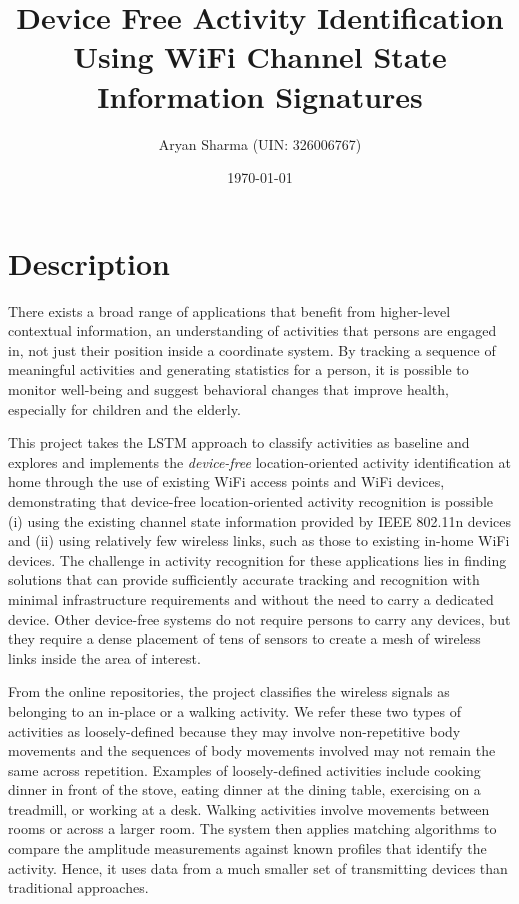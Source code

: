 \documentclass[letterpaper]{article}
\title{Device Free Activity Identification Using WiFi Channel State Information Signatures}
\author{Aryan Sharma (UIN: 326006767)}
\date{\today}
\newcommand\blankpage{%
	\null
	\thispagestyle{empty}%
	\addtocounter{page}{-1}%
	\newpage}
\begin{document}
\maketitle

\newpage

\tableofcontents

\newpage

\begin{versionhistory}
\end{versionhistory}

\newpage

\section{Description}
\label{sec:introduction}

There exists a broad range of applications that benefit from higher-level contextual information, an understanding of activities that persons are engaged in, not just their position inside a coordinate system. By tracking a sequence of meaningful activities and generating statistics for a person, it is possible to monitor well-being and suggest behavioral changes that improve health, especially for children and the elderly. 

This project takes the LSTM approach to classify activities\cite{c1} as baseline and explores and implements the \textit{device-free} location-oriented activity identification at home through the use of existing WiFi access points and WiFi devices\cite{c2}, demonstrating that device-free location-oriented activity recognition is possible (i) using the existing channel state information provided by IEEE 802.11n devices \cite{c8} and (ii) using relatively few wireless links, such as those to existing in-home WiFi devices. The challenge in activity recognition for these applications lies in finding solutions that can provide sufficiently accurate tracking and recognition with minimal infrastructure requirements and without the need to carry a dedicated device. Other device-free systems do not require persons to carry any devices, but they require a dense placement of tens of sensors to create a mesh of wireless links inside the area of interest.

From the online repositories, the project classifies the wireless signals as belonging to an in-place or a walking activity. We refer these two types of activities as loosely-defined because they may involve non-repetitive body movements and the sequences of body movements involved may not remain the same across repetition. Examples of loosely-defined activities include cooking dinner in front of the stove, eating dinner at the dining table, exercising on a treadmill, or working at a desk. Walking activities involve movements between rooms or across a larger room. The system then applies matching algorithms to compare the amplitude measurements against known profiles that identify the activity. Hence, it uses data from a much smaller set of transmitting devices than traditional approaches.
\end{document}
